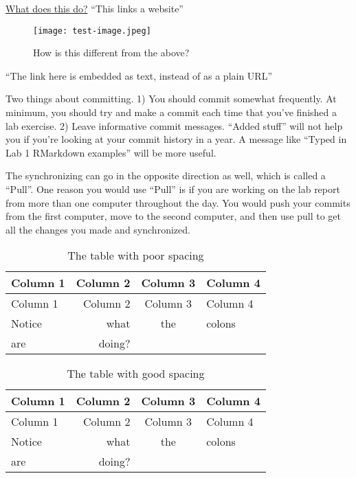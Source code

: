 \documentclass[]{article}
\begin{document}
\href{https://google.com}{What does this do?} ``This links a website''

\begin{figure}
\centering
\texttt{[image: test-image.jpeg]}
\caption{How is this different from the above?}
\end{figure}

``The link here is embedded as text, instead of as a plain URL''

Two things about committing. 1) You should commit somewhat frequently.
At minimum, you should try and make a commit each time that you've
finished a lab exercise. 2) Leave informative commit messages. ``Added
stuff'' will not help you if you're looking at your commit history in a
year. A message like ``Typed in Lab 1 RMarkdown examples'' will be more
useful.

The synchronizing can go in the opposite direction as well, which is
called a ``Pull''. One reason you would use ``Pull'' is if you are
working on the lab report from more than one computer throughout the
day. You would push your commits from the first computer, move to the
second computer, and then use pull to get all the changes you made and
synchronized.

\begin{longtable}[]{@{}lrcl@{}}
\caption{The table with poor spacing}\tabularnewline
\toprule
Column 1 & Column 2 & Column 3 & Column 4\tabularnewline
\midrule
\endfirsthead
\toprule
Column 1 & Column 2 & Column 3 & Column 4\tabularnewline
\midrule
\endhead
Notice & what & the & colons\tabularnewline
are & doing? & &\tabularnewline
\bottomrule
\end{longtable}

\begin{longtable}[]{@{}lrcl@{}}
\caption{The table with good spacing}\tabularnewline
\toprule
Column 1 & Column 2 & Column 3 & Column 4\tabularnewline
\midrule
\endfirsthead
\toprule
Column 1 & Column 2 & Column 3 & Column 4\tabularnewline
\midrule
\endhead
Notice & what & the & colons\tabularnewline
are & doing? & &\tabularnewline
\bottomrule
\end{longtable}
\end{document}
